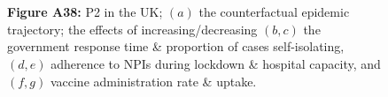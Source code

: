 \documentclass[paper=a4,fontsize=11pt]{article}
\begin{document}
\begin{figure}[!h]
  \\
  \hspace{1.76cm}
  \\
  \caption*{\textbf{Figure A38:} P2 in the UK; $(a)$ the counterfactual epidemic trajectory; the effects of increasing/decreasing $(b,c)$ the government response time \& proportion of cases self-isolating, $(d,e)$ adherence to NPIs during lockdown \& hospital capacity, and $(f,g)$ vaccine administration rate \& uptake.}
\end{figure}
\end{document}
